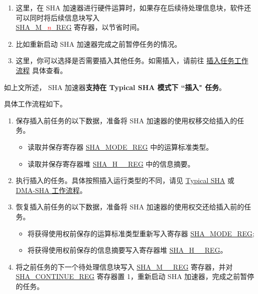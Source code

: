 \documentclass[main\_\_CN.tex]{subfiles}
\begin{document}
\clearpage
\begin{tiplisting}\label{others:sha-note-typical-sha}
\vspace{-2.5em}
\begin{enumerate}
\item 这里，在 SHA 加速器进行硬件运算时，如果存在后续待处理信息块，软件还可以同时将后续信息块写入 \\ \hyperref[regdesc:SHAMNREG]{SHA\_M\_\textcolor{red}{\it{n}}\_REG} 寄存器，以节省时间。
\item 比如重新启动 SHA 加速器完成之前暂停任务的情况。
\item 这里，你可以选择是否需要插入其他任务。如需插入，请前往 \hyperref[others:sha-interleaved]{插入任务工作流程} 具体查看。
\end{enumerate} 
\end{tiplisting}

\label{others:sha-interleaved}如上文所述，\chipname{} SHA 加速器\textbf{支持在 Typical SHA 模式下 ``插入" 任务}。 

具体工作流程如下。

\begin{enumerate}
    \item 保存插入前任务的以下数据，准备将 SHA 加速器的使用权移交给插入的任务。
        \begin{itemize}
            \item 读取并保存寄存器 \hyperref[regdesc:SHAMODEREG]{SHA\_MODE\_REG} 中的运算标准类型。
            \item 读取并保存寄存器堆 \hyperref[regdesc:SHAHNREG]{SHA\_H\_\_REG} 中的信息摘要。
        \end{itemize}
    \item 执行插入的任务。具体按照插入运行类型的不同，请见 \hyperref[sec:sha-typical-sha]{Typical SHA} 或 \hyperref[sec:sha-dma-sha]{DMA-SHA 工作流程}。
    \item 恢复插入前任务的以下数据，准备将 SHA 加速器的使用权交还给插入前的任务。
        \begin{itemize}
            \item 将获得使用权前保存的运算标准类型重新写入寄存器 \hyperref[regdesc:SHAMODEREG]{SHA\_MODE\_REG};
            \item 将获得使用权前保存的信息摘要写入寄存器堆 \hyperref[regdesc:SHAHNREG]{SHA\_H\_\_REG}。
        \end{itemize}
    \item 将之前任务的下一个待处理信息块写入 \hyperref[regdesc:SHAMNREG]{SHA\_M\_\_REG} 寄存器，并对 \hyperref[regdesc:SHACONTINUEREG]{SHA\_CONTINUE\_REG} 寄存器置 1，重新启动 SHA 加速器，完成之前暂停的任务。
\end{enumerate}
\end{document}
